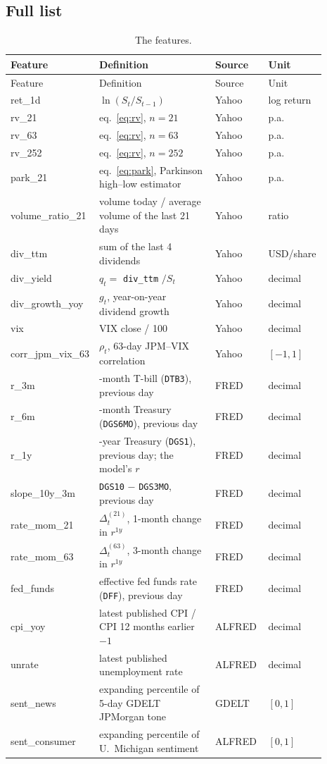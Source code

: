 \documentclass[11pt]{article}
\newcommand{\code}[1]{\texttt{#1}}
\begin{document}
\subsection{Full list}
\begin{longtable}{@{}>{\ttfamily\raggedright\arraybackslash}p{0.2\linewidth}>{\raggedright\arraybackslash}p{0.40\linewidth}>{\raggedright\arraybackslash}p{0.17\linewidth}>{\raggedright\arraybackslash}p{0.12\linewidth}@{}}
\caption{The \wFeatures{} features.}\label{tab:features}\\
\toprule
\normalfont Feature & Definition & Source & Unit \\
\midrule
\endfirsthead
\toprule
\normalfont Feature & Definition & Source & Unit \\
\midrule
\endhead
ret\_1d & $\ln(S_t/S_{t-1})$ & Yahoo & log return \\
rv\_21 & eq.~\eqref{eq:rv}, $n=21$ & Yahoo & p.a. \\
rv\_63 & eq.~\eqref{eq:rv}, $n=63$ & Yahoo & p.a. \\
rv\_252 & eq.~\eqref{eq:rv}, $n=252$ & Yahoo & p.a. \\
park\_21 & eq.~\eqref{eq:park}, Parkinson high--low estimator & Yahoo & p.a. \\
volume\_ratio\_21 & volume today / average volume of the last 21 days & Yahoo & ratio \\
div\_ttm & sum of the last 4 dividends & Yahoo & USD/share \\
div\_yield & $q_t = $ \code{div\_ttm} $/S_t$ & Yahoo & decimal \\
div\_growth\_yoy & $g_t$, year-on-year dividend growth & Yahoo & decimal \\
vix & VIX close / 100 & Yahoo & decimal \\
corr\_jpm\_vix\_63 & $\rho_t$, 63-day JPM--VIX correlation & Yahoo & $[-1,1]$ \\
r\_3m & 3-month T-bill (\code{DTB3}), previous day & FRED & decimal \\
r\_6m & 6-month Treasury (\code{DGS6MO}), previous day & FRED & decimal \\
r\_1y & 1-year Treasury (\code{DGS1}), previous day; the model's $r$ & FRED & decimal \\
slope\_10y\_3m & \code{DGS10} $-$ \code{DGS3MO}, previous day & FRED & decimal \\
rate\_mom\_21 & $\Delta^{(21)}_t$, 1-month change in $r^{1y}$ & FRED & decimal \\
rate\_mom\_63 & $\Delta^{(63)}_t$, 3-month change in $r^{1y}$ & FRED & decimal \\
fed\_funds & effective fed funds rate (\code{DFF}), previous day & FRED & decimal \\
cpi\_yoy & latest published CPI / CPI 12 months earlier $-1$ & ALFRED & decimal \\
unrate & latest published unemployment rate & ALFRED & decimal \\
sent\_news & expanding percentile of 5-day GDELT JPMorgan tone & GDELT & $[0,1]$ \\
sent\_consumer & expanding percentile of U.~Michigan sentiment & ALFRED & $[0,1]$ \\
\bottomrule
\end{longtable}
\end{document}
